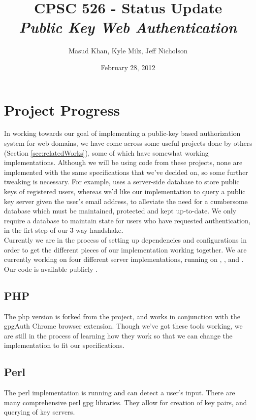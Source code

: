 \documentclass[11pt]{article}
\begin{document}
\title{\bf CPSC 526 - Status Update \\ \emph{Public Key Web Authentication}}
\author{Masud Khan, Kyle Milz, Jeff Nicholson}
\date{February 28, 2012}
\maketitle

\tableofcontents
\pagebreak

\section{Project Progress} \label{sec:progress}
In working towards our goal of implementing a public-key based authorization system for web domains, we have come across some useful projects done by others (Section \ref{sec:relatedWorks}), some of which have somewhat working implementations.  Although we will be using code from these projects, none are implemented with the same specifications that we've decided on, so some further tweaking is necessary.  For example,  uses a server-side database to store public keys of registered users, whereas we'd like our implementation to query a public key server given the user's email address, to alleviate the need for a cumbersome database which must be maintained, protected and kept up-to-date. We only require a database to maintain state for users who have requested authentication, in the firt step of our 3-way handshake.\\
Currently we are in the process of setting up dependencies and configurations in order to get the different pieces of our implementation working together.  We are currently working on four different server implementations, running on , ,  and . Our code is available publicly \cite{526proj}.\\

\subsection{PHP} \label{subsec:php}
The php version is forked from the  project, and works in conjunction with the gpgAuth Chrome browser extension.  Though we've got these tools working, we are still in the process of learning how they work so that we can change the implementation to fit our specifications. 
\subsection{Perl} \label{subsec:perl}
The perl implementation is running and can detect a user's input. There are many comprehensive perl gpg libraries. They allow for creation of key pairs, and querying of key servers.
\end{document}
